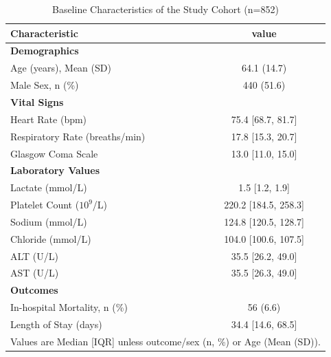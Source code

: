 
\begin{table}[h]
\centering
\caption{Baseline Characteristics of the Study Cohort (n=852)}
\label{tab:patient_characteristics}
\begin{tabular}{@{}lc@{}}
\toprule
\textbf{Characteristic} & \textbf{value} \\
\midrule
\multicolumn{2}{l}{\textbf{Demographics}} \\
Age (years), Mean (SD) & 64.1 (14.7) \\
Male Sex, n (\%) & 440 (51.6) \\
\multicolumn{2}{l}{\textbf{Vital Signs}} \\
Heart Rate (bpm) & 75.4 [68.7, 81.7] \\
Respiratory Rate (breaths/min) & 17.8 [15.3, 20.7] \\
Glasgow Coma Scale & 13.0 [11.0, 15.0] \\
\multicolumn{2}{l}{\textbf{Laboratory Values}} \\
Lactate (mmol/L) & 1.5 [1.2, 1.9] \\
Platelet Count ($10^9$/L) & 220.2 [184.5, 258.3] \\
Sodium (mmol/L) & 124.8 [120.5, 128.7] \\
Chloride (mmol/L) & 104.0 [100.6, 107.5] \\
ALT (U/L) & 35.5 [26.2, 49.0] \\
AST (U/L) & 35.5 [26.3, 49.0] \\
\multicolumn{2}{l}{\textbf{Outcomes}} \\
In-hospital Mortality, n (\%) & 56 (6.6) \\
Length of Stay (days) & 34.4 [14.6, 68.5] \\
\bottomrule
\multicolumn{2}{l}{\footnotesize Values are Median [IQR] unless outcome/sex (n, \%) or Age (Mean (SD)).}
\end{tabular}
\end{table}
